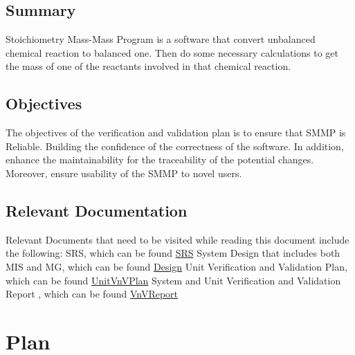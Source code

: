 \documentclass[12pt, titlepage]{article}
\begin{document}
\subsection{Summary}

Stoichiometry Mass-Mass Program is a software that convert unbalanced chemical
reaction to balanced one. Then do some necessary calculations to get the mass of
one of the reactants involved in that chemical reaction.

\subsection{Objectives}


The objectives of the verification and validation plan is to ensure that SMMP is
Reliable. Building the confidence of the correctness of the software. In addition, 
enhance the maintainability for the traceability of the potential changes. Moreover,
ensure usability of the SMMP to novel users.

\subsection{Relevant Documentation}

Relevant Documents that need to be visited while reading this document include the following:
\newline
SRS, which can be found  \href{https://github.com/deemaalomair1/CAS741_project/tree/master/docs/SRS}{SRS} \cite{SoftwareSpecification}
\newline
System Design that includes both MIS and MG, which can be found \href{https://github.com/deemaalomair1/CAS741project/tree/master/docs/Design}{Design} \cite{Designdocument}
\newline
Unit Verification and Validation Plan,  which can be found \href{https://github.com/deemaalomair1/CAS741project/tree/master/docs/VnVPlan/UnitVnVPlan}{UnitVnVPlan} \cite{UnitVnVPlan}
\newline
System and Unit Verification and Validation Report ,  which can be found \href{https://github.com/deemaalomair1/CAS741project/tree/master/docs/VnVReport}{VnVReport} \cite{VnVReport}

\section{Plan}

\end{document}
